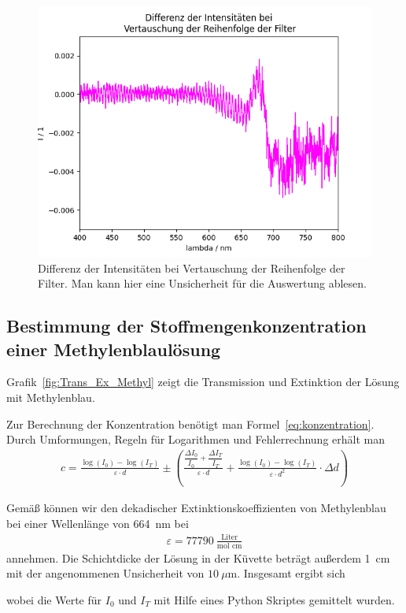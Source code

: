 \documentclass{article}
\begin{document}
\begin{figure}[H]
\centering
\caption{Differenz der Intensitäten bei Vertauschung der Reihenfolge der Filter. Man kann hier eine Unsicherheit für die Auswertung ablesen.}
\label{fig:reihenfolge2}

\includegraphics[scale=0.7]{reihenfolge2.png}
\end{figure}






\subsection{Bestimmung der Stoffmengenkonzentration einer Methylenblaulösung}

Grafik~\ref{fig:Trans_Ex_Methyl} zeigt die Transmission und Extinktion der Lösung mit Methylenblau.

Zur Berechnung der Konzentration benötigt man Formel~\eqref{eq:konzentration}. Durch Umformungen, Regeln für Logarithmen und Fehlerrechnung erhält man
\begin{align*}
c = \frac{\log(I_0) - \log(I_T)}{\varepsilon\cdot d} \pm \left(\frac{\dfrac{\Delta I_0}{I_0} + \dfrac{\Delta I_T}{I_T}}{\varepsilon\cdot d} + \frac{\log(I_0) - \log(I_T)}{\varepsilon\cdot d^2} \cdot \Delta d\right)
\end{align*}

Gemäß \cite{moodle} können wir den  dekadischer Extinktionskoeffizienten von Methylenblau bei einer Wellenlänge von 664~nm bei
\begin{align*}
\varepsilon =  77790~\frac{\text{Liter}}{\text{mol~cm}}
\end{align*}
annehmen. Die Schichtdicke der Lösung in der Küvette beträgt außerdem 1~cm mit der angenommenen Unsicherheit von $10~\mu$m. Insgesamt ergibt sich 

wobei die Werte für $I_0$ und $I_T$ mit Hilfe eines Python Skriptes gemittelt wurden.
\end{document}
